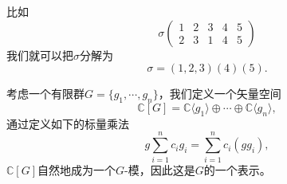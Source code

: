\documentclass[9pt]{extarticle}
\newcommand{\cc}{\mathbb{C}}
\begin{document}
比如
\[
	\sigma\begin{pmatrix}
	1&2&3&4&5\\
	2&3&1&4&5
	\end{pmatrix}
\]
我们就可以把$\sigma$分解为
\[
	\sigma=(1,2,3)(4)(5).
\]

\para 考虑一个有限群$G=\{g_1,\cdots,g_n\}$，我们定义一个矢量空间
\[
	\cc [G]=\cc\langle g_1\rangle \oplus \cdots \oplus \cc\langle g_n\rangle,
\]
通过定义如下的标量乘法
\[
	g\sum_{i=1}^n c_i g_i=\sum_{i=1}^n c_i(gg_i),
\]
$\cc [G]$自然地成为一个$G$-模，因此这是$G$的一个表示。
\end{document}
